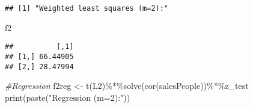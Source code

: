 \documentclass[
]{article}
\newenvironment{Shaded}{\begin{snugshade}}{\end{snugshade}}
\newcommand{\CommentTok}[1]{\textcolor[rgb]{0.56,0.35,0.01}{\textit{#1}}}
\newcommand{\DecValTok}[1]{\textcolor[rgb]{0.00,0.00,0.81}{#1}}
\newcommand{\FunctionTok}[1]{\textcolor[rgb]{0.00,0.00,0.00}{#1}}
\newcommand{\NormalTok}[1]{#1}
\newcommand{\OtherTok}[1]{\textcolor[rgb]{0.56,0.35,0.01}{#1}}
\newcommand{\SpecialCharTok}[1]{\textcolor[rgb]{0.00,0.00,0.00}{#1}}
\newcommand{\StringTok}[1]{\textcolor[rgb]{0.31,0.60,0.02}{#1}}
\begin{document}
\begin{Shaded}
\end{Shaded}

\begin{verbatim}
## [1] "Weighted least squares (m=2):"
\end{verbatim}

\begin{Shaded}
\begin{Highlighting}[]
\NormalTok{f2}
\end{Highlighting}
\end{Shaded}

\begin{verbatim}
##          [,1]
## [1,] 66.44905
## [2,] 28.47994
\end{verbatim}

\begin{Shaded}
\begin{Highlighting}[]
\CommentTok{\#Regression}
\NormalTok{f2reg }\OtherTok{\textless{}{-}} \FunctionTok{t}\NormalTok{(L2)}\SpecialCharTok{\%*\%}\FunctionTok{solve}\NormalTok{(}\FunctionTok{cor}\NormalTok{(salesPeople))}\SpecialCharTok{\%*\%}\NormalTok{z\_test}
\FunctionTok{print}\NormalTok{(}\FunctionTok{paste}\NormalTok{(}\StringTok{"Regression (m=2):"}\NormalTok{))}
\end{Highlighting}
\end{Shaded}
\end{document}
